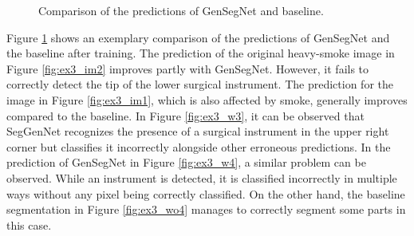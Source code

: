 \begin{figure}[bt]
    \hfill
    \vspace{0.3cm} 
    \hfill
    \hfill
    \hfill
    \caption{Comparison of the predictions of GenSegNet and baseline.}\label{fig:ex3_mask_showcase}
\end{figure}
Figure \ref{fig:ex3_mask_showcase} shows an exemplary comparison of the predictions of GenSegNet and the baseline after training.
The prediction of the original heavy-smoke image in Figure \ref{fig:ex3_im2} improves partly with GenSegNet.
However, it fails to correctly detect the tip of the lower surgical instrument.
The prediction for the image in Figure \ref{fig:ex3_im1}, which is also affected by smoke, generally improves compared to the baseline.
In Figure \ref{fig:ex3_w3}, it can be observed that SegGenNet recognizes the presence of a surgical instrument in the upper right corner but classifies it incorrectly alongside other erroneous predictions.
In the prediction of GenSegNet in Figure \ref{fig:ex3_w4}, a similar problem can be observed. 
While an instrument is detected, it is classified incorrectly in multiple ways without any pixel being correctly classified. 
On the other hand, the baseline segmentation in Figure \ref{fig:ex3_wo4} manages to correctly segment some parts in this case.


